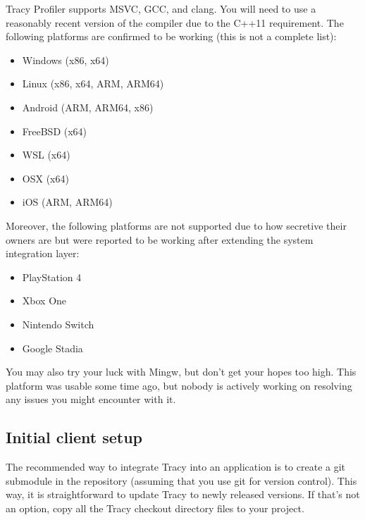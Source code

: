 \documentclass[hidelinks,titlepage,a4paper]{article}
\begin{document}
Tracy Profiler supports  MSVC, GCC, and clang. You will need to use a reasonably recent version of the compiler due to the C++11 requirement. The following platforms are confirmed to be working (this is not a complete list):

\begin{itemize}
\item Windows (x86, x64)
\item Linux (x86, x64, ARM, ARM64)
\item Android (ARM, ARM64, x86)
\item FreeBSD (x64)
\item WSL (x64)
\item OSX (x64)
\item iOS (ARM, ARM64)
\end{itemize}

Moreover, the following platforms are not supported due to how secretive their owners are but were reported to be working after extending the system integration layer:

\begin{itemize}
\item PlayStation 4
\item Xbox One
\item Nintendo Switch
\item Google Stadia
\end{itemize}

You may also try your luck with Mingw, but don't get your hopes too high. This platform was usable some time ago, but nobody is actively working on resolving any issues you might encounter with it.

\subsection{Initial client setup}
\label{initialsetup}

The recommended way to integrate Tracy into an application is to create a git submodule in the repository (assuming that you use git for version control). This way, it is straightforward to update Tracy to newly released versions. If that's not an option, copy all the Tracy checkout directory files to your project.
\end{document}
